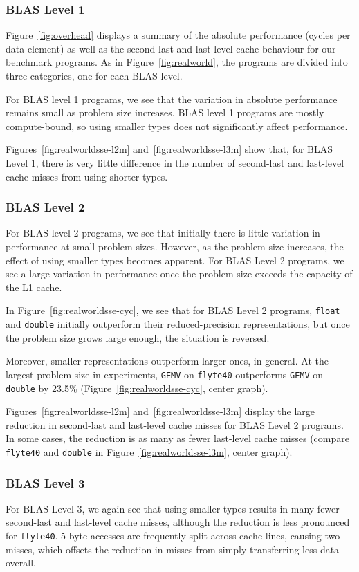 \documentclass{sig-alternate-05-2015}
\begin{document}
\subsubsection{BLAS Level 1} Figure~\ref{fig:overhead} displays a summary of
the absolute performance (cycles per data element) as well as the second-last
and last-level cache behaviour for our benchmark programs. As in
Figure~\ref{fig:realworld}, the programs are divided into three categories, one
for each BLAS level.

For BLAS level 1 programs, we see that the variation in absolute performance
remains small as problem size increases. BLAS level 1 programs are mostly
compute-bound, so using smaller types does not significantly affect
performance.

Figures~\ref{fig:realworldsse-l2m} and~\ref{fig:realworldsse-l3m} show that,
for BLAS Level 1, there is very little difference in the number of second-last
and last-level cache misses from using shorter types.

\subsubsection{BLAS Level 2} For BLAS level 2 programs, we see that initially
there is little variation in performance at small problem sizes. However, as
the problem size increases, the effect of using smaller types becomes apparent.
For BLAS Level 2 programs, we see a large variation in performance once the
problem size exceeds the capacity of the L1 cache.

In Figure~\ref{fig:realworldsse-cyc}, we see that for BLAS Level 2 programs,
\texttt{float} and \texttt{double} initially outperform their reduced-precision
representations, but once the problem size grows large enough, the situation is
reversed.

Moreover, smaller representations outperform larger ones, in general. At the
largest problem size in experiments, \texttt{GEMV} on \texttt{flyte40}
outperforms \texttt{GEMV} on \texttt{double} by 23.5\%
(Figure~\ref{fig:realworldsse-cyc}, center graph).

Figures~\ref{fig:realworldsse-l2m} and~\ref{fig:realworldsse-l3m} display the
large reduction in second-last and last-level cache misses for BLAS Level 2
programs. In some cases, the reduction is as many as  fewer last-level
cache misses (compare \texttt{flyte40} and \texttt{double} in
Figure~\ref{fig:realworldsse-l3m}, center graph).

\subsubsection{BLAS Level 3} For BLAS Level 3, we again see that using smaller
types results in many fewer second-last and last-level cache misses, although
the reduction is less pronounced for \texttt{flyte40}. 5-byte accesses are
frequently split across cache lines, causing two misses, which offsets the
reduction in misses from simply transferring less data overall.
\end{document}
